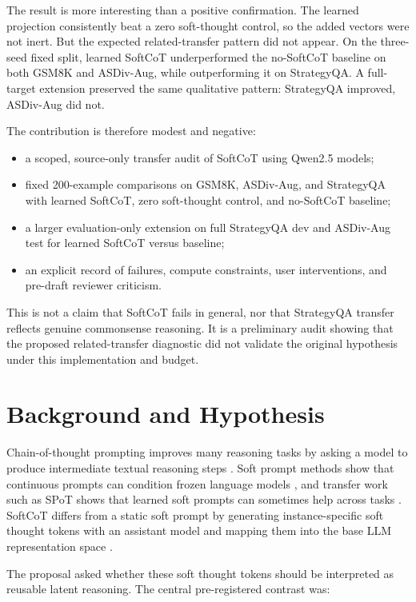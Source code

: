 \documentclass{article}
\begin{document}
The result is more interesting than a positive confirmation. The learned projection consistently beat a zero soft-thought control, so the added vectors were not inert. But the expected related-transfer pattern did not appear. On the three-seed fixed split, learned SoftCoT underperformed the no-SoftCoT baseline on both GSM8K and ASDiv-Aug, while outperforming it on StrategyQA. A full-target extension preserved the same qualitative pattern: StrategyQA improved, ASDiv-Aug did not.

The contribution is therefore modest and negative:

\begin{itemize}
  \item a scoped, source-only transfer audit of SoftCoT using Qwen2.5 models;
  \item fixed 200-example comparisons on GSM8K, ASDiv-Aug, and StrategyQA with learned SoftCoT, zero soft-thought control, and no-SoftCoT baseline;
  \item a larger evaluation-only extension on full StrategyQA dev and ASDiv-Aug test for learned SoftCoT versus baseline;
  \item an explicit record of failures, compute constraints, user interventions, and pre-draft reviewer criticism.
\end{itemize}

This is not a claim that SoftCoT fails in general, nor that StrategyQA transfer reflects genuine commonsense reasoning. It is a preliminary audit showing that the proposed related-transfer diagnostic did not validate the original hypothesis under this implementation and budget.

\section{Background and Hypothesis}

Chain-of-thought prompting improves many reasoning tasks by asking a model to produce intermediate textual reasoning steps \citep{wei2022cot}. Soft prompt methods show that continuous prompts can condition frozen language models \citep{lester2021prompttuning}, and transfer work such as SPoT shows that learned soft prompts can sometimes help across tasks \citep{vu2022spot}. SoftCoT differs from a static soft prompt by generating instance-specific soft thought tokens with an assistant model and mapping them into the base LLM representation space \citep{xuyi2025softcot}.

The proposal asked whether these soft thought tokens should be interpreted as reusable latent reasoning. The central pre-registered contrast was:
\end{document}
